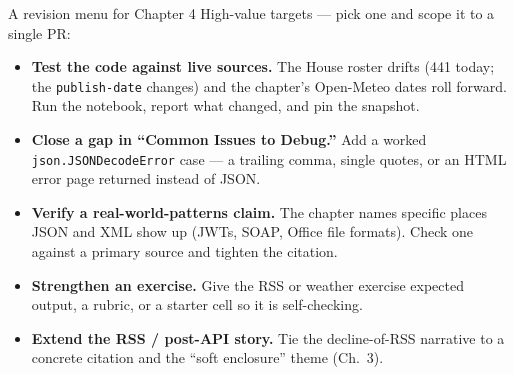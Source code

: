 \documentclass[9pt,aspectratio=169]{beamer}
\begin{document}
\begin{frame}{A revision menu for Chapter 4}
    High-value targets --- pick one and scope it to a single PR:
    \begin{itemize}
        \item \textbf{Test the code against live sources.} The House roster drifts (441 today; the \texttt{publish-date} changes) and the chapter's Open-Meteo dates roll forward. Run the notebook, report what changed, and pin the snapshot.
        \item \textbf{Close a gap in ``Common Issues to Debug.''} Add a worked \texttt{json.JSONDecodeError} case --- a trailing comma, single quotes, or an HTML error page returned instead of JSON.
        \item \textbf{Verify a real-world-patterns claim.} The chapter names specific places JSON and XML show up (JWTs, SOAP, Office file formats). Check one against a primary source and tighten the citation.
        \item \textbf{Strengthen an exercise.} Give the RSS or weather exercise expected output, a rubric, or a starter cell so it is self-checking.
        \item \textbf{Extend the RSS / post-API story.} Tie the decline-of-RSS narrative to a concrete citation and the ``soft enclosure'' theme (Ch.~3).
    \end{itemize}
\end{frame}
\end{document}
